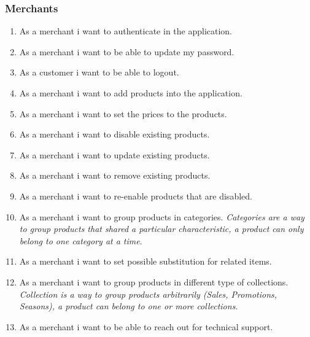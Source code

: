 \subsubsection{Merchants}
\begin{enumerate}[label=USR-\arabic*]
    \item As a merchant i want to authenticate in the application.
    \item As a merchant i want to be able to update my password.
    \item As a customer i want to be able to logout.
    \item As a merchant i want to add products into the application.
    \item As a merchant i want to set the prices to the products.
    \item As a merchant i want to disable existing products.
    \item As a merchant i want to update existing products.
    \item As a merchant i want to remove existing products.
    \item As a merchant i want to re-enable products that are disabled.
    \item As a merchant i want to group products in categories.
    \textit{Categories are a way to group products that shared a particular 
    characteristic, a product can only belong to one category at a time}.
    \item As a merchant i want to set possible substitution for related items.
    \item As a merchant i want to group products in different type of 
    collections. \textit{Collection is a way to group products arbitrarily 
    (Sales, Promotions, Seasons), a product can belong to one or more 
    collections.}
    \item As a merchant i want to be able to reach out for technical support.
\end{enumerate}
